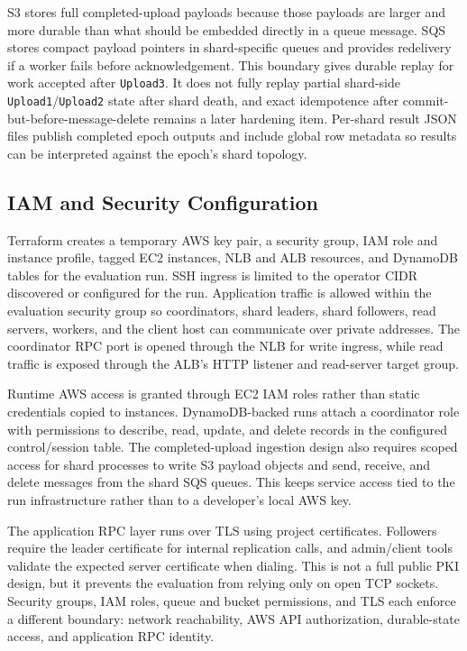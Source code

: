 \documentclass[conference]{IEEEtran}
\begin{document}
S3 stores full completed-upload payloads because those payloads are larger and more durable than what should be embedded directly in a queue message. SQS stores compact payload pointers in shard-specific queues and provides redelivery if a worker fails before acknowledgement. This boundary gives durable replay for work accepted after \texttt{Upload3}. It does not fully replay partial shard-side \texttt{Upload1}/\texttt{Upload2} state after shard death, and exact idempotence after commit-but-before-message-delete remains a later hardening item. Per-shard result JSON files publish completed epoch outputs and include global row metadata so results can be interpreted against the epoch's shard topology.

\subsection{IAM and Security Configuration}

Terraform creates a temporary AWS key pair, a security group, IAM role and instance profile, tagged EC2 instances, NLB and ALB resources, and DynamoDB tables for the evaluation run. SSH ingress is limited to the operator CIDR discovered or configured for the run. Application traffic is allowed within the evaluation security group so coordinators, shard leaders, shard followers, read servers, workers, and the client host can communicate over private addresses. The coordinator RPC port is opened through the NLB for write ingress, while read traffic is exposed through the ALB's HTTP listener and read-server target group.

Runtime AWS access is granted through EC2 IAM roles rather than static credentials copied to instances. DynamoDB-backed runs attach a coordinator role with permissions to describe, read, update, and delete records in the configured control/session table. The completed-upload ingestion design also requires scoped access for shard processes to write S3 payload objects and send, receive, and delete messages from the shard SQS queues. This keeps service access tied to the run infrastructure rather than to a developer's local AWS key.

The application RPC layer runs over TLS using project certificates. Followers require the leader certificate for internal replication calls, and admin/client tools validate the expected server certificate when dialing. This is not a full public PKI design, but it prevents the evaluation from relying only on open TCP sockets. Security groups, IAM roles, queue and bucket permissions, and TLS each enforce a different boundary: network reachability, AWS API authorization, durable-state access, and application RPC identity.
\end{document}
